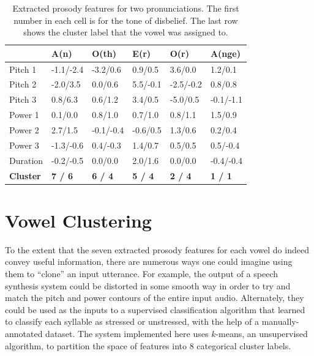 \documentclass{article}
\begin{document}
\begin{table}[]
\footnotesize
\centering
\begin{tabular}{|p{1cm}|p{1cm}|p{1cm}|p{1cm}|p{1cm}|p{1cm}|}
\hline
\textbf{}              & \textbf{A(n)}  & \textbf{O(th)} & \textbf{E(r)}  & \textbf{O(r)}  & \textbf{A(nge)} \\ \hline
Pitch 1                & -1.1/-2.4      & -3.2/0.6       & 0.9/0.5        & 3.6/0.0        & 1.2/0.1        \\ \hline
Pitch 2                & -2.0/3.5       & 0.0/0.6        & 5.5/-0.1       & -2.5/-0.2      & 0.8/0.8        \\ \hline
Pitch 3                & 0.8/6.3        & 0.6/1.2        & 3.4/0.5        & -5.0/0.5       & -0.1/-1.1      \\ \hline
Power 1                & 0.1/0.0        & 0.8/1.0        & 0.7/1.0        & 0.8/1.1        & 1.5/0.9        \\ \hline
Power 2                & 2.7/1.5        & -0.1/-0.4      & -0.6/0.5       & 1.3/0.6        & 0.2/0.4        \\ \hline
Power 3                & -1.3/-0.6      & 0.4/-0.3       & 1.4/0.7        & 0.5/0.5        & 0.5/-0.4       \\ \hline
Duration               & -0.2/-0.5      & 0.0/0.0        & 2.0/1.6        & 0.0/0.0        & -0.4/-0.4      \\ \hline
\textbf{Cluster} & \textbf{7 / 6} & \textbf{6 / 4} & \textbf{5 / 4} & \textbf{2 / 4} & \textbf{1 / 1} \\ \hline
\end{tabular}
\caption{Extracted prosody features for two pronunciations. The first number in each cell is for the tone of disbelief. The last row shows the cluster label that the vowel was assigned to.}
\label{table:pitchpow1}
\end{table}

\section{Vowel Clustering}
\label{sec:vowels}

To the extent that the seven extracted prosody features for each vowel do indeed convey useful information, there are numerous ways one could imagine using them to ``clone'' an input utterance.
For example, the output of a speech synthesis system could be distorted in some smooth way in order to try and match the pitch and power contours of the entire input audio.
Alternately, they could be used as the inputs to a supervised classification algorithm that learned to classify each syllable as stressed or unstressed, with the help of a manually-annotated dataset.
The system implemented here uses $k$-means, an unsupervised algorithm, to partition the space of features into 8 categorical cluster labels.
\end{document}
